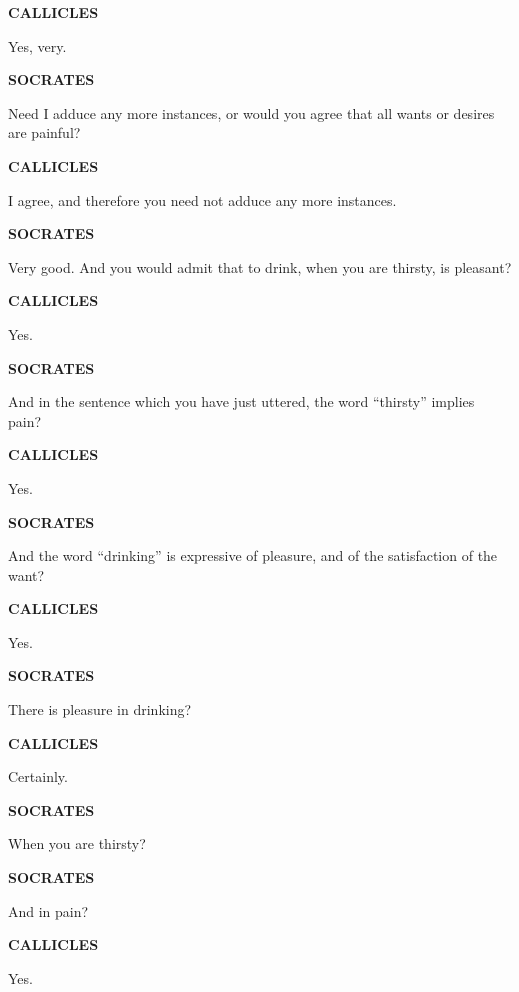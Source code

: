 \documentclass[11pt,letter]{article}
\begin{document}
\par \textbf{CALLICLES}
\par   Yes, very.

\par \textbf{SOCRATES}
\par   Need I adduce any more instances, or would you agree that all wants or desires are painful?

\par \textbf{CALLICLES}
\par   I agree, and therefore you need not adduce any more instances.

\par \textbf{SOCRATES}
\par   Very good. And you would admit that to drink, when you are thirsty, is pleasant?

\par \textbf{CALLICLES}
\par   Yes.

\par \textbf{SOCRATES}
\par   And in the sentence which you have just uttered, the word “thirsty” implies pain?

\par \textbf{CALLICLES}
\par   Yes.

\par \textbf{SOCRATES}
\par   And the word “drinking” is expressive of pleasure, and of the satisfaction of the want?

\par \textbf{CALLICLES}
\par   Yes.

\par \textbf{SOCRATES}
\par   There is pleasure in drinking?

\par \textbf{CALLICLES}
\par   Certainly.

\par \textbf{SOCRATES}
\par   When you are thirsty?

\par \textbf{SOCRATES}
\par   And in pain?

\par \textbf{CALLICLES}
\par   Yes.
\end{document}
